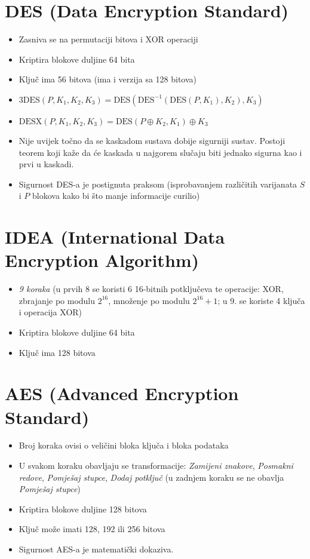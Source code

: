 \documentclass[11pt]{article}
\newcommand{\DES}{\text{DES}}
\begin{document}
\section{DES (Data Encryption Standard)}
\begin{itemize}
  \item Zasniva se na permutaciji bitova i XOR operaciji
  \item Kriptira blokove duljine 64 bita
  \item Ključ ima 56 bitova (ima i verzija sa 128 bitova)
  \item $3\DES(P, K_1, K_2, K_3) = \DES(\DES^{-1}(\DES(P, K_1), K_2), K_3)$
  \item $\text{DESX}(P, K_1, K_2, K_3) = \DES(P \oplus K_2, K_1) \oplus K_3$
  \item Nije uvijek točno da se kaskadom sustava dobije sigurniji sustav. Postoji teorem koji kaže da će kaskada u najgorem slučaju biti jednako sigurna kao i prvi u kaskadi.
  \item Sigurnost DES-a je postignuta praksom (isprobavanjem različitih varijanata $S$ i $P$ blokova kako bi što manje informacije curilio)
\end{itemize}

\section{IDEA (International Data Encryption Algorithm)}
\begin{itemize}
  \item \emph{9 koraka} (u prvih 8 se koristi 6 16-bitnih potključeva te operacije: XOR, zbrajanje po modulu $2^{16}$, množenje po modulu $2^{16}+1$; u 9. se koriste 4 ključa i operacija XOR)
  \item Kriptira blokove duljine 64 bita
  \item Ključ ima 128 bitova
\end{itemize}

\section{AES (Advanced Encryption Standard)}
\begin{itemize}
  \item Broj koraka ovisi o veličini bloka ključa i bloka podataka
  \item U svakom koraku obavljaju se transformacije: \emph{Zamijeni znakove}, \emph{Posmakni redove}, \emph{Pomješaj stupce}, \emph{Dodaj potključ} (u zadnjem koraku se ne obavlja \emph{Pomješaj stupce})
  \item Kriptira blokove duljine 128 bitova
  \item Ključ može imati 128, 192 ili 256 bitova
  \item Sigurnost AES-a je matematički dokaziva.
\end{itemize}
\end{document}
